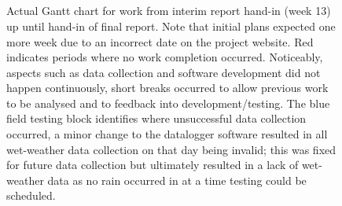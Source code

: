 \vspace*{\fill}
\begin{figure}[H]
\centering
\begin{ganttchart}{1}{21}
   \\
   \\
   \\
 \\
 \\
   \\
  \\
 \\
 \\
 \\
 \\
 \\
 \\
 \\
\end{ganttchart}
\caption[Actual progress Gantt chart]{Actual Gantt chart for work from interim report hand-in (week 13) up until hand-in of final report. Note that initial plans expected one more week due to an incorrect date on the project website. Red indicates periods where no work completion occurred. Noticeably, aspects such as data collection and software development did not happen continuously, short breaks occurred to allow previous work to be analysed and to feedback into development/testing. The blue field testing block identifies where unsuccessful data collection occurred, a minor change to the datalogger software resulted in all wet-weather data collection on that day being invalid; this was fixed for future data collection but ultimately resulted in a lack of wet-weather data as no rain occurred in at a time testing could be scheduled.
}
\label{fig:actual_gantt_chart}
\end{figure}
\vspace*{\fill}






